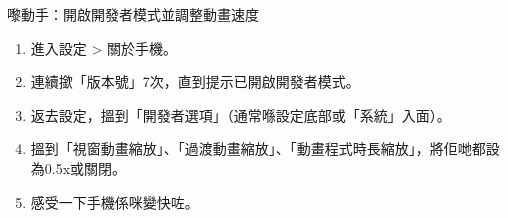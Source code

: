 \begin{tcbpractice}{嚟動手：開啟開發者模式並調整動畫速度}
\begin{enumerate}
  \item 進入設定 > 關於手機。
  \item 連續撳「版本號」7次，直到提示已開啟開發者模式。
  \item 返去設定，搵到「開發者選項」（通常喺設定底部或「系統」入面）。
  \item 搵到「視窗動畫縮放」、「過渡動畫縮放」、「動畫程式時長縮放」，將佢哋都設為0.5x或關閉。
  \item 感受一下手機係咪變快咗。
\end{enumerate}

\end{tcbpractice}
